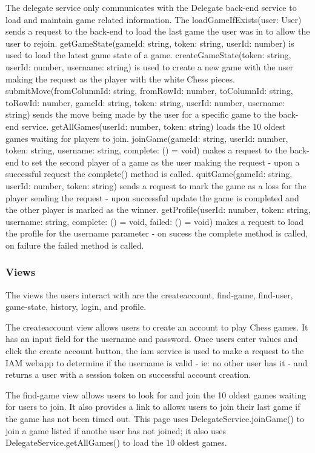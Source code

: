 \documentclass[12pt]{article}
\begin{document}
The delegate service only communicates with the Delegate back-end service to load and maintain game related information. 
The loadGameIfExists(user: User) sends a request to the back-end to load the last game the user was in to allow the user to rejoin. 
getGameState(gameId: string, token: string, userId: number) is used to load the latest game state of a game.
createGameState(token: string, userId: number, username: string) is used to create a new game with the user making the request 
as the player with the white Chess pieces. submitMove(fromColumnId: string, fromRowId: number, toColumnId: string, toRowId: number, 
gameId: string, token: string, userId: number, username: string) sends the move being made by the user for a specific game to the back-end service. 
getAllGames(userId: number, token: string) loads the 10 oldest games waiting for players to join. 
joinGame(gameId: string, userId: number, token: string, username: string, complete: () =\> void) makes a request to the back-end to 
set the second player of a game as the user making the request - upon a successful request the complete() method is called. 
quitGame(gameId: string, userId: number, token: string) sends a request to mark the game as a loss for the player sending the 
request - upon successful update the game is completed and the other player is marked as the winner. 
getProfile(userId: number, token: string, username: string, complete: () =\> void, failed: () =\> void) makes a request to load the profile 
for the username parameter - on sucess the complete method is called, on failure the failed method is called.

\subsubsection{Views}
The views the users interact with are the createaccount, find-game, find-user, game-state, history, login,
and profile.

The createaccount view allows users to create an account to play Chess games. It has an input field for the 
username and password. Once users enter values and click the create account button, the iam service is used 
to make a request to the IAM webapp to determine if the username is valid - ie: no other user has it - and returns a 
user with a session token on successful account creation.

The find-game view allows users to look for and join the 10 oldest games waiting for users to join. It also provides a link to 
allows users to join their last game if the game has not been timed out. This page uses DelegateService.joinGame() to join a game listed if 
anothe user has not joined; it also uses DelegateService.getAllGames() to load the 10 oldest games.
\end{document}
